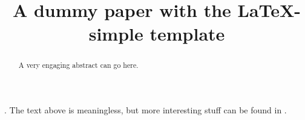 \documentclass[11pt]{article}
\title{A dummy paper with the LaTeX-simple template}
\author[1]{\nameemail{Ada Lovelace}{ada@lovelace.com}}
\author[2,3]{\nameemail{Maria Mitchell}{maria@mitchell.com}}
\author[4]{\nameemail{Katherine Johnson}{katherine@johnson.com}}
\affil[1]{Ada's Institution}
\affil[2]{Maria's Institution 1}
\affil[3]{Maria's Institution 2}
\affil[4]{Katherine's Institution}
\begin{document}
\maketitle

\begin{abstract}
  A very engaging abstract can go here.
\end{abstract}

\blindtext. The text above is meaningless, but more interesting stuff can be found in \citet{mitchell2003venus}.

\blindtext[2]

\blinditemize

\blindtext

\blindmathfalse

\blindtext[2]

\begin{acknowledgements}
  \blindtext
\end{acknowledgements}







\appendix
\end{document}
